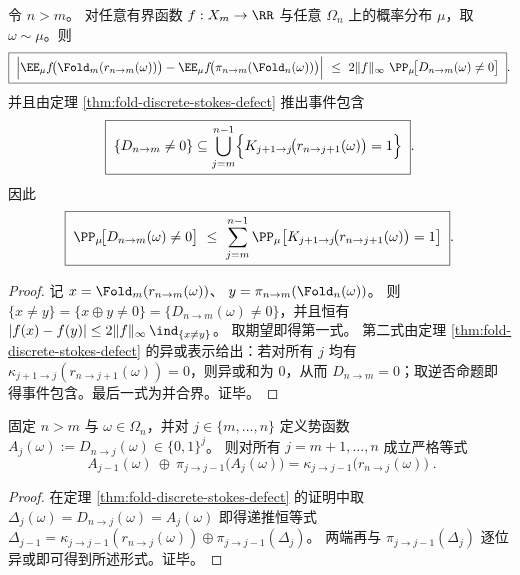 \begin{corollary}[多尺度曲率积分的误差上界]\label{cor:fold-discrete-stokes-auditable-bound}
令 \(n>m\)。
对任意有界函数 \(f:X_m\to\RR\) 与任意 \(\Omega_n\) 上的概率分布 \(\mu\)，取 \(\omega\sim\mu\)。则
\[
\boxed{\;
\Bigl|\EE_\mu f\!\bigl(\Fold_m(r_{n\to m}(\omega))\bigr)-\EE_\mu f\!\bigl(\pi_{n\to m}(\Fold_n(\omega))\bigr)\Bigr|
\ \le\ 2\|f\|_\infty\ \PP_\mu\!\bigl[D_{n\to m}(\omega)\neq 0\bigr]\; }.
\]
并且由定理 \ref{thm:fold-discrete-stokes-defect} 推出事件包含
\[
\boxed{\;
\{D_{n\to m}\neq 0\}\subseteq \bigcup_{j=m}^{n-1}\Bigl\{K_{j+1\to j}\!\bigl(r_{n\to j+1}(\omega)\bigr)=1\Bigr\}\; }.
\]
因此
\[
\boxed{\;
\PP_\mu\!\bigl[D_{n\to m}(\omega)\neq 0\bigr]\ \le\ \sum_{j=m}^{n-1}\PP_\mu\!\left[K_{j+1\to j}\!\bigl(r_{n\to j+1}(\omega)\bigr)=1\right]\; }.
\]
\end{corollary}

\begin{proof}
记
\(
x=\Fold_m(r_{n\to m}(\omega))
\)、
\(
y=\pi_{n\to m}(\Fold_n(\omega))
\)。
则 \(\{x\neq y\}=\{x\oplus y\neq 0\}=\{D_{n\to m}(\omega)\neq 0\}\)，并且恒有
\(
|f(x)-f(y)|\le 2\|f\|_\infty\,\ind_{\{x\neq y\}}
\)。
取期望即得第一式。
第二式由定理 \ref{thm:fold-discrete-stokes-defect} 的异或表示给出：若对所有 \(j\) 均有 \(\kappa_{j+1\to j}(r_{n\to j+1}(\omega))=0\)，则异或和为 \(0\)，从而 \(D_{n\to m}=0\)；取逆否命题即得事件包含。最后一式为并合界。证毕。
\end{proof}


\begin{proposition}[分辨率条带上的势函数表示]\label{prop:fold-discrete-poincare-band}
固定 \(n>m\) 与 \(\omega\in\Omega_n\)，并对 \(j\in\{m,\dots,n\}\) 定义势函数 \(A_j(\omega):=D_{n\to j}(\omega)\in\{0,1\}^j\)。
则对所有 \(j=m+1,\dots,n\) 成立严格等式
\[
\boxed{\;
A_{j-1}(\omega)\ \oplus\ \pi_{j\to j-1}\!\bigl(A_j(\omega)\bigr)
=\kappa_{j\to j-1}\!\bigl(r_{n\to j}(\omega)\bigr)\; }.
\]
\end{proposition}

\begin{proof}
在定理 \ref{thm:fold-discrete-stokes-defect} 的证明中取 \(\Delta_j(\omega)=D_{n\to j}(\omega)=A_j(\omega)\) 即得递推恒等式
\(
\Delta_{j-1}=\kappa_{j\to j-1}(r_{n\to j}(\omega))\oplus \pi_{j\to j-1}(\Delta_j)
\)。
两端再与 \(\pi_{j\to j-1}(\Delta_j)\) 逐位异或即可得到所述形式。证毕。
\end{proof}

